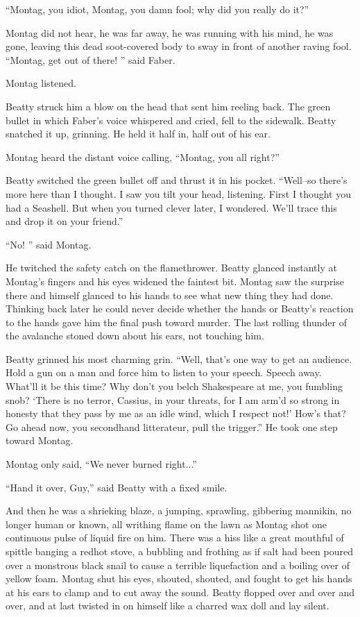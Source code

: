 \documentclass[11pt,openany]{book}
\begin{document}
``Montag, you idiot, Montag, you damn fool; why did you really do it?''

Montag did not hear, he was far away, he was running with his mind, he was gone, leaving this dead soot-covered body to sway in front of another raving fool. ``Montag, get out of there! '' said Faber.

Montag listened.

Beatty struck him a blow on the head that sent him reeling back. The green bullet in which Faber's voice whispered and cried, fell to the sidewalk. Beatty snatched it up, grinning. He held it half in, half out of his ear.

Montag heard the distant voice calling, ``Montag, you all right?''

Beatty switched the green bullet off and thrust it in his pocket. ``Well--so there's more here than I thought. I saw you tilt your head, listening. First I thought you had a Seashell. But when you turned clever later, I wondered. We'll trace this and drop it on your friend.''

``No! '' said Montag.

He twitched the safety catch on the flamethrower. Beatty glanced instantly at Montag's fingers and his eyes widened the faintest bit. Montag saw the surprise there and himself glanced to his hands to see what new thing they had done. Thinking back later he could never decide whether the hands or Beatty's reaction to the hands gave him the final push toward murder. The last rolling thunder of the avalanche stoned down about his ears, not touching him.

Beatty grinned his most charming grin. ``Well, that's one way to get an audience. Hold a gun on a man and force him to listen to your speech. Speech away. What'll it be this time? Why don't you belch Shakespeare at me, you fumbling snob? `There is no terror, Cassius, in your threats, for I am arm'd so strong in honesty that they pass by me as an idle wind, which I respect not!' How's that? Go ahead now, you secondhand litterateur, pull the trigger.'' He took one step toward Montag.

Montag only said, ``We never burned right...''

``Hand it over, Guy,'' said Beatty with a fixed smile.

And then he was a shrieking blaze, a jumping, sprawling, gibbering mannikin, no longer human or known, all writhing flame on the lawn as Montag shot one continuous pulse of liquid fire on him. There was a hiss like a great mouthful of spittle banging a redhot stove, a bubbling and frothing as if salt had been poured over a monstrous black snail to cause a terrible liquefaction and a boiling over of yellow foam. Montag shut his eyes, shouted, shouted, and fought to get his hands at his ears to clamp and to cut away the sound. Beatty flopped over and over and over, and at last twisted in on himself like a charred wax doll and lay silent.
\end{document}
